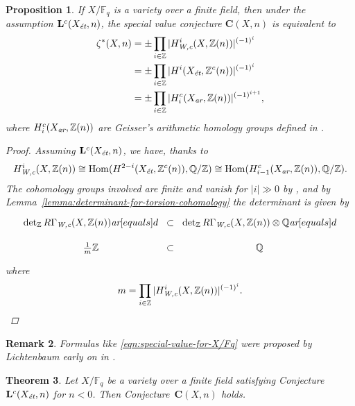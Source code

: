 \documentclass[10pt,a4paper,oneside]{article}
\DeclareMathOperator{\Hom}{Hom}
\newcommand{\FF}{\mathbb{F}}
\newcommand{\QQ}{\mathbb{Q}}
\newcommand{\ZZ}{\mathbb{Z}}
\renewcommand{\det}{\operatorname{det}}
\newcommand{\ar}{\text{\it ar}}
\newcommand{\et}{\text{\it \'{e}t}}
\newcommand{\Wc}{\text{\it W,c}}
\theoremstyle{myplain}
\newtheorem{theorem}{Theorem}[section]
\newtheorem{proposition}[theorem]{Proposition}
\theoremstyle{mydefinition}
\newtheorem{remark}[theorem]{Remark}
\numberwithin{equation}{section}
\begin{document}
\begin{proposition}
  \label{prop:C(X,n)-over-finite-fields}
  If $X/\FF_q$ is a variety over a finite field, then under the assumption
  $\mathbf{L}^c (X_\et,n)$, the special value conjecture $\mathbf{C} (X,n)$ is
  equivalent to
  \begin{align}
    \label{eqn:special-value-for-X/Fq}
    \notag \zeta^* (X,n) & = \pm \prod_{i \in \ZZ} |H_\Wc^i (X, \ZZ(n))|^{(-1)^i} \\
                         & = \pm \prod_{i \in \ZZ} |H^i (X_\et, \ZZ^c (n))|^{(-1)^i} \\
    \notag & = \pm \prod_{i \in \ZZ} |H_i^c (X_\ar, \ZZ (n))|^{(-1)^{i+1}},
  \end{align}
  where $H_i^c (X_\ar, \ZZ (n))$ are Geisser's arithmetic homology groups
  defined in \cite{Geisser-2010-arithmetic-homology}.

  \begin{proof}
    Assuming $\mathbf{L}^c (X_\et,n)$, we have, thanks to
    \cite[Proposition~7.7]{Beshenov-Weil-etale-1}
    \[ H^i_\Wc (X, \ZZ (n)) \cong
      \Hom (H^{2-i} (X_\et, \ZZ^c (n)), \QQ/\ZZ) \cong
      \Hom (H_{i-1}^c (X_\ar, \ZZ (n)), \QQ/\ZZ). \]
    The cohomology groups involved are finite and vanish for $|i| \gg 0$ by
    \cite[Proposition~4.2]{Beshenov-Weil-etale-1}, and by
    Lemma~\ref{lemma:determinant-for-torsion-cohomology} the determinant is given by
    \[ \begin{tikzcd}[row sep=0.75em, column sep=0pt]
        \det_\ZZ R\Gamma_\Wc (X, \ZZ (n)) \ar[equals]{d} & \subset & \det_\ZZ R\Gamma_\Wc (X, \ZZ (n)) \otimes \QQ \ar[equals]{d} \\
        \frac{1}{m}\ZZ & \subset & \QQ
      \end{tikzcd} \]
    where
    \[ m = \prod_{i \in \ZZ} |H_\Wc^i (X, \ZZ(n))|^{(-1)^i}. \qedhere \]
  \end{proof}
\end{proposition}

\begin{remark}
  Formulas like \eqref{eqn:special-value-for-X/Fq} were proposed by Lichtenbaum
  early on in \cite{Lichtenbaum-1984}.
\end{remark}

\begin{theorem}
  \label{thm:C(X,n)-over-finite-fields}
  Let $X/\FF_q$ be a variety over a finite field satisfying
  Conjecture~$\mathbf{L}^c (X_\et, n)$ for $n < 0$. Then
  Conjecture~$\mathbf{C} (X,n)$ holds.
\end{theorem}
\end{document}
